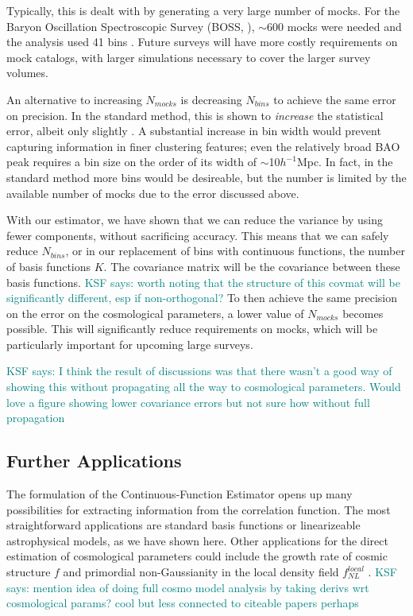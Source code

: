\documentclass[modern]{aastex62}
\newcommand{\est}{the Continuous-Function Estimator\xspace}
\newcommand{\hmpc}{$h^{-1}$Mpc}
\newcommand{\KSF}[1]{\textcolor{teal}{KSF says: #1}}
\begin{document}
Typically, this is dealt with by generating a very large number of mocks.
For the Baryon Oscillation Spectroscopic Survey (BOSS, \citealt{Dawson2013}), $\sim$600 mocks were needed and the analysis used 41 bins \citep{Sanchez2012}.
Future surveys will have more costly requirements on mock catalogs, with larger simulations necessary to cover the larger survey volumes.

An alternative to increasing $N_{mocks}$ is decreasing $N_{bins}$ to achieve the same error on precision.
In the standard method, this is shown to \emph{increase} the statistical error, albeit only slightly \cite{Percival2014}.
A substantial increase in bin width would prevent capturing information in finer clustering features; even the relatively broad BAO peak requires a bin size on the order of its width of $\sim$10\hmpc.
In fact, in the standard method more bins would be desireable, but the number is limited by the available number of mocks due to the error discussed above.

With our estimator, we have shown that we can reduce the variance by using fewer components, without sacrificing accuracy.
This means that we can safely reduce $N_{bins}$, or in our replacement of bins with continuous functions, the number of basis functions $K$.
The covariance matrix will be the covariance between these basis functions. \KSF{worth noting that the structure of this covmat will be significantly different, esp if non-orthogonal?}
To then achieve the same precision on the error on the cosmological parameters, a lower value of $N_{mocks}$ becomes possible.
This will significantly reduce requirements on mocks, which will be particularly important for upcoming large surveys. 

\KSF{I think the result of discussions was that there wasn't a good way of showing this without propagating all the way to cosmological parameters. Would love a figure showing lower covariance errors but not sure how without full propagation}

\subsection{Further Applications}

The formulation of \est opens up many possibilities for extracting information from the correlation function.
The most straightforward applications are standard basis functions or linearizeable astrophysical models, as we have shown here.
Other applications for the direct estimation of cosmological parameters could include the growth rate of cosmic structure $f$ \citep{Satpathy2016, Reid2018} and primordial non-Gaussianity in the local density field $f^{local}_{NL}$ \citep{Karagiannis2014}.
\KSF{mention idea of doing full cosmo model analysis by taking derivs wrt cosmological params? cool but less connected to citeable papers perhaps}
\end{document}
